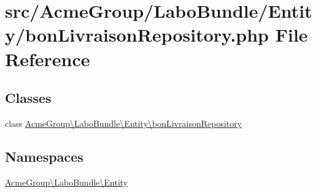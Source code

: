 \hypertarget{bon_livraison_repository_8php}{\section{src/\+Acme\+Group/\+Labo\+Bundle/\+Entity/bon\+Livraison\+Repository.php File Reference}
\label{bon_livraison_repository_8php}
}
\subsection*{Classes}
\begin{DoxyCompactItemize}
\item 
class \hyperlink{class_acme_group_1_1_labo_bundle_1_1_entity_1_1bon_livraison_repository}{Acme\+Group\textbackslash{}\+Labo\+Bundle\textbackslash{}\+Entity\textbackslash{}bon\+Livraison\+Repository}
\end{DoxyCompactItemize}
\subsection*{Namespaces}
\begin{DoxyCompactItemize}
\item 
 \hyperlink{namespace_acme_group_1_1_labo_bundle_1_1_entity}{Acme\+Group\textbackslash{}\+Labo\+Bundle\textbackslash{}\+Entity}
\end{DoxyCompactItemize}
